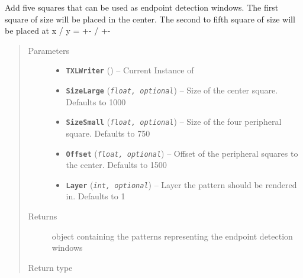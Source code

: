 \documentclass[letterpaper,10pt,english]{sphinxmanual}
\begin{document}
\begin{fulllineitems}
\label{Chapters/PythonModuleReference/ShapeLibrary/TXLWizard.ShapeLibrary.EndpointDetectionWindows:TXLWizard.ShapeLibrary.EndpointDetectionWindows.GetEndpointDetectionWindows}
Add five squares that can be used as endpoint detection windows.
The first square of size  will be placed in the center.
The second to fifth square of size  will be placed at x / y = +- / +-
\begin{quote}\begin{description}
\item[{Parameters}] \leavevmode\begin{itemize}
\item {} 
\textbf{\texttt{TXLWriter}} ({\hyperref[Chapters/PythonModuleReference/TXLWriter/TXLWizard.TXLWriter:TXLWizard.TXLWriter.TXLWriter]{}}) -- Current Instance of {\hyperref[Chapters/PythonModuleReference/TXLWriter/TXLWizard.TXLWriter:TXLWizard.TXLWriter.TXLWriter]{}}

\item {} 
\textbf{\texttt{SizeLarge}} (\emph{\texttt{float, optional}}) -- Size of the center square.
Defaults to 1000

\item {} 
\textbf{\texttt{SizeSmall}} (\emph{\texttt{float, optional}}) -- Size of the four peripheral square.
Defaults to 750

\item {} 
\textbf{\texttt{Offset}} (\emph{\texttt{float, optional}}) -- Offset of the peripheral squares to the center.
Defaults to 1500

\item {} 
\textbf{\texttt{Layer}} (\emph{\texttt{int, optional}}) -- Layer the pattern should be rendered in.
Defaults to 1

\end{itemize}

\item[{Returns}] \leavevmode
{} object containing the patterns representing the endpoint detection windows

\item[{Return type}] \leavevmode
{\hyperref[Chapters/PythonModuleReference/Patterns/TXLWizard.Patterns.Structure:TXLWizard.Patterns.Structure.Structure]{}}

\end{description}\end{quote}

\end{fulllineitems}
\end{document}
